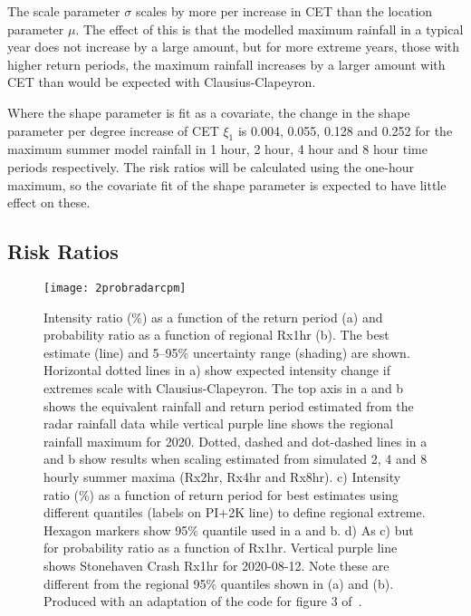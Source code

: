 The scale parameter $\sigma$ scales by more per increase in CET than the location parameter $\mu$.
The effect of this is that the modelled maximum rainfall in a typical year does not increase by a large amount,
    but for more extreme years, those with higher return periods,
    the maximum rainfall increases by a larger amount with CET than would be expected with Clausius-Clapeyron.

Where the shape parameter is fit as a covariate,
    the change in the shape parameter per degree increase of CET $\xi_1$ is
    0.004, 0.055, 0.128 and 0.252 for the maximum summer model rainfall in
    1 hour, 2 hour, 4 hour and 8 hour time periods respectively.
The risk ratios will be calculated using the one-hour maximum,
    so the covariate fit of the shape parameter is expected to have little effect on these.

\subsection{Risk Ratios}\label{subsec:riskratio}

\begin{figure}[H]
    \centering
    \texttt{[image: 2probradarcpm]}
    \caption[Intensity ratio (\%) as a function of the return period (a,c) and
    probability ratio as a function of regional Rx1hr (b, d).
    ]{
        Intensity ratio (\%) as a function of the return period (a) and
    probability ratio as a function of regional Rx1hr (b).
    The best estimate (line) and 5--95\% uncertainty range (shading) are shown.
    Horizontal dotted lines in a) show expected intensity change if extremes scale with Clausius-Clapeyron.
    The top axis in a and b shows the equivalent rainfall and return period estimated from the radar rainfall data while
    vertical purple line shows the regional rainfall maximum for 2020.
    Dotted, dashed and dot-dashed lines in a and b show results when scaling estimated from simulated 2, 4 and 8 hourly summer maxima (Rx2hr, Rx4hr and Rx8hr).
    c) Intensity ratio (\%) as a function of return period for best estimates using different quantiles (labels on PI+2K line) to define regional extreme.
    Hexagon markers show 95\% quantile used in a and b.
    d) As c) but for probability ratio as a function of Rx1hr.
    Vertical purple line shows Stonehaven Crash Rx1hr for 2020-08-12.
    Note these are different from the regional 95\% quantiles shown in (a) and (b).
    Produced with an adaptation of the code for figure 3 of~\cite{Tett_Soon}.}
    \label{fig:2probradarcpm}
\end{figure}

